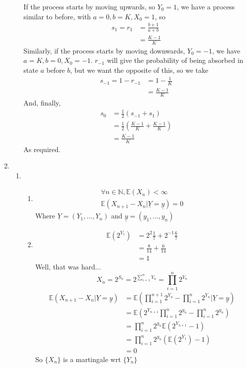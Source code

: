 \documentclass{article}
\begin{document}
\begin{enumerate}
\begin{enumerate}
If the process starts by moving upwards, so $Y_0 = 1$, we have a process similar to before, with $a=0,b=K, X_0 =1$, so
\begin{align*}
s_1 = r_1 &= \frac{b+1}{a+b}\\
&= \frac{K-1}{K}
\end{align*}
Similarly, if the process starts by moving downwards, $Y_0 = -1$, we have $a=K,b=0,X_0 = -1$. $r_{-1}$ will give the probability of being absorbed in state $a$ before $b$, but we want the opposite of this, so we take 
\begin{align*}
s_{-1} = 1-r_{-1} &= 1-\frac{1}{K}\\
&= \frac{K-1}{K}
\end{align*}
And, finally,
\begin{align*}
s_0 &= \frac{1}{2}(s_{-1} + s_1)\\
&= \frac{1}{2}(\frac{K-1}{K} + \frac{K-1}{K})\\
&= \frac{K-1}{K}
\end{align*}
As required.
\end{enumerate}
\clearpage
\item
\begin{enumerate}
\item
\begin{enumerate}
\item

\begin{align*}
\forall n \in \mathbb{N}, \mathbb{E}(X_n) < \infty\\
\mathbb{E}(X_{n+1}-X_n | \underline{Y} = \underline{y}) = 0
\end{align*}
Where $\underline{Y} = (Y_1,...,Y_n)$ and $\underline{y} = (y_1,...,y_n)$

\item
\begin{align*}
\mathbb{E}(2^{Y_1}) &= 2^2\frac{1}{7} + 2^{-1}\frac{6}{7}\\
&= \frac{8}{14} + \frac{6}{14}\\
&=1
\end{align*}
Well, that was hard...
$$
X_n = 2^{S_n} = 2^{\sum\limits_{i=1}^n Y_n} = \prod^n_{i=1}2^{Y_n}
$$
\begin{align*}
\mathbb{E}(X_{n+1}-X_n| \underline{Y} = \underline{y})& = \mathbb{E}(\prod^{n+1}_{i=1}2^{Y_n} - \prod^n_{i=1}2^{Y_n} | \underline{Y} = \underline{y})\\
&= \mathbb{E}(2^{Y_{n+1}}\prod^{n}_{i=1}2^{y_n} - \prod^n_{i=1}2^{y_n})\\
&= \prod^n_{i=1}2^{y_n} \mathbb{E}(2^{Y_{n+1}}-1)\\
&= \prod^n_{i=1}2^{y_n} (\mathbb{E}(2^{Y_1}) -1)\\
&= 0
\end{align*}
So $\{X_n\}$ is a martingale wrt $\{Y_n\}$


\end{enumerate}
\end{enumerate}
\end{enumerate}
\end{document}
